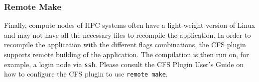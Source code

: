 \subsubsection{Remote Make}
Finally, compute nodes of HPC systems often have a light-weight version of Linux and may not have all the necessary files to recompile the application. In order to recompile the application with the different flags combinations, the CFS plugin supports remote building of the application. The compilation is then run on, for example, a login node via \texttt{ssh}. Please consult the CFS Plugin User's Guide on how to configure the CFS plugin to use \texttt{remote make}.



